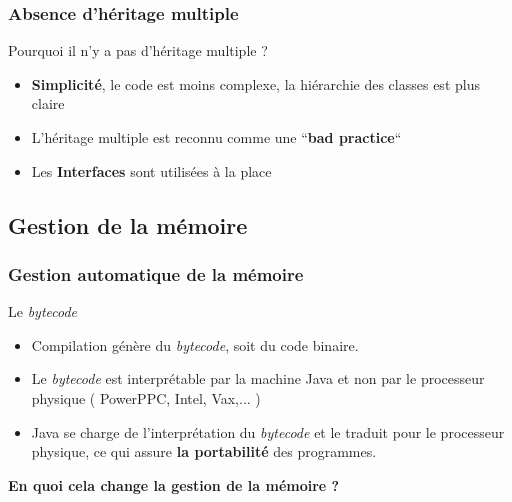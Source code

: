 \documentclass[handout]{beamer}
\begin{document}
\begin{frame}
	\frametitle{Absence d'héritage multiple}

	\begin{block}{Pourquoi il n'y a pas d'héritage multiple ?}
		\begin{itemize}
			\item \textbf{Simplicité}, le code est moins complexe, la hiérarchie des classes est plus claire
			\item L'héritage multiple est reconnu comme une ``\textbf{bad practice}``
			\item Les \textbf{Interfaces} sont utilisées à la place 
		\end{itemize}
	\end{block}

\end{frame}

\subsection{Gestion de la mémoire}

\begin{frame}
	\frametitle{Gestion automatique de la mémoire}
	\begin{block}{Le \textit{bytecode}}
		\begin{itemize}
			\item Compilation génère du \textit{bytecode}, soit du code binaire.
			\item Le \textit{bytecode} est interprétable par la machine Java et non par le processeur physique ( PowerPPC, Intel, Vax,... )
			\item Java se charge de l'interprétation du \textit{bytecode} et le traduit pour le processeur physique, ce qui assure \textbf{la portabilité} des programmes.
		\end{itemize}
	\end{block}
	\begin{center}
		\textbf{En quoi cela change la gestion de la mémoire ?}
	\end{center} 
\end{frame}
\end{document}
